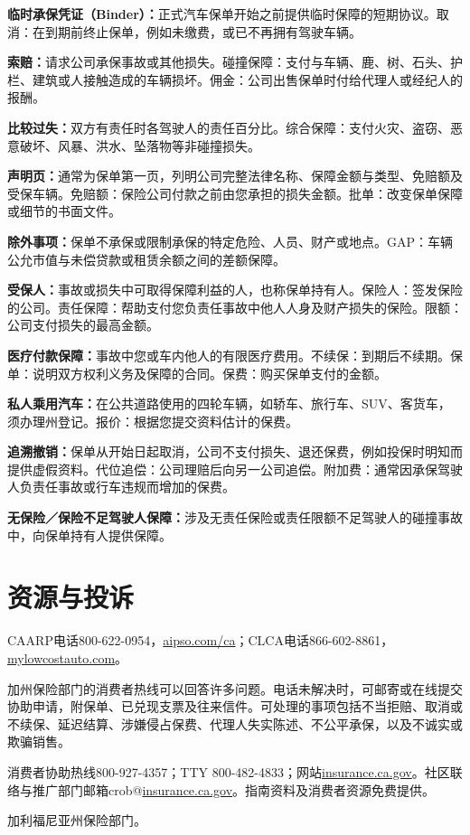 \documentclass[UTF8,fontset=none,11pt,a4paper]{ctexart}
\begin{document}
\textbf{临时承保凭证（Binder）：}正式汽车保单开始之前提供临时保障的短期协议。取消：在到期前终止保单，例如未缴费，或已不再拥有\allowbreak\mbox{驾驶车辆。}


\textbf{索赔：}请求公司承保事故或其他损失。碰撞保障：支付与车辆、鹿、树、石头、护栏、建筑或人接触造成的车辆损坏。佣金：公司出售保单时付给代理人或经纪\allowbreak\mbox{人的报酬。}


\textbf{比较过失：}双方有责任时各驾驶人的责任百分比。综合保障：支付火灾、盗窃、恶意破坏、风暴、洪水、坠落物等非\allowbreak\mbox{碰撞损失。}


\textbf{声明页：}通常为保单第一页，列明公司完整法律名称、保障金额与类型、免赔额及受保车辆。免赔额：保险公司付款之前由您承担的损失金额。批单：改变保单保障或细节的\allowbreak\mbox{书面文件。}


\textbf{除外事项：}保单不承保或限制承保的特定危险、人员、财产或地点。GAP：车辆公允市值与未偿贷款或租赁余额之间的\allowbreak\mbox{差额保障。}


\textbf{受保人：}事故或损失中可取得保障利益的人，也称保单持有人。保险人：签发保险的公司。责任保障：帮助支付您负责任事故中他人人身及财产损失的保险。限额：公司支付损失的\allowbreak\mbox{最高金额。}


\textbf{医疗付款保障：}事故中您或车内他人的有限医疗费用。不续保：到期后不续期。保单：说明双方权利义务及保障的合同。保费：购买保单支\allowbreak\mbox{付的金额。}


\textbf{私人乘用汽车：}在公共道路使用的四轮车辆，如轿车、旅行车、SUV、客货车，须办理州登记。报价：根据您提交资料估\allowbreak\mbox{计的保费。}


\textbf{追溯撤销：}保单从开始日起取消，公司不支付损失、退还保费，例如投保时明知而提供虚假资料。代位追偿：公司理赔后向另一公司追偿。附加费：通常因承保驾驶人负责任事故或行车违规而增\allowbreak\mbox{加的保费。}


\textbf{无保险／保险不足驾驶人保障：}涉及无责任保险或责任限额不足驾驶人的碰撞事故中，向保单持有人\allowbreak\mbox{提供保障。}


\section*{资源与投诉}
CAARP电话800-622-0954，\url{aipso.com/ca}；CLCA电话866-602-8861，\url{mylowcostauto.com}。


加州保险部门的消费者热线可以回答许多问题。电话未解决时，可邮寄或在线提交协助申请，附保单、已兑现支票及往来信件。可处理的事项包括不当拒赔、取消或不续保、延迟结算、涉嫌侵占保费、代理人失实陈述、不公平承保，以及不诚实或\allowbreak\mbox{欺骗销售。}


消费者协助热线800-927-4357；TTY 800-482-4833；网站\url{insurance.ca.gov}。社区联络与推广部门邮箱crob@\url{insurance.ca.gov}。指南资料及消费者资源\allowbreak\mbox{免费提供。}


加利福尼亚州保\allowbreak\mbox{险部门。}
\end{document}
